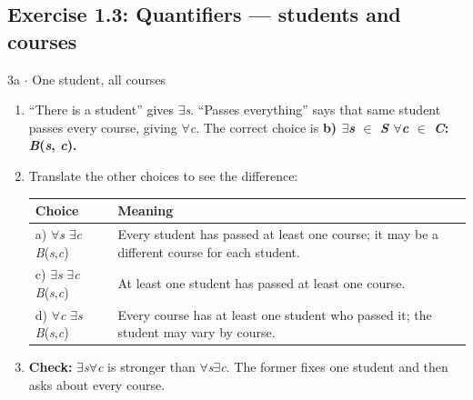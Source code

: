 \documentclass[11pt]{article}
\begin{document}
\begin{keepsection}\subsection{Exercise 1.3: Quantifiers — students and courses}

\begin{workedbox}{3a \ensuremath{\cdot} One student, all courses}
\begin{enumerate}
\item “There is a student” gives \ensuremath{\exists}\textit{s}. “Passes everything” says that same student passes every course, giving \ensuremath{\forall}\textit{c}. The correct choice is \textbf{b) \ensuremath{\exists}\textit{s} \ensuremath{\in} \textit{S} \ensuremath{\forall}\textit{c} \ensuremath{\in} \textit{C}: \textit{B}(\textit{s}, \textit{c}).}
\item {}
Translate the other choices to see the difference:

\begin{center}\small\begin{tabularx}{\linewidth}{>{\raggedright\arraybackslash}X>{\raggedright\arraybackslash}X}\toprule
\textbf{Choice} & \textbf{Meaning} \\ \midrule
a) \ensuremath{\forall}\textit{s} \ensuremath{\exists}\textit{c} \textit{B}(\textit{s},\textit{c}) & Every student has passed at least one course; it may be a different course for each student. \\
c) \ensuremath{\exists}\textit{s} \ensuremath{\exists}\textit{c} \textit{B}(\textit{s},\textit{c}) & At least one student has passed at least one course. \\
d) \ensuremath{\forall}\textit{c} \ensuremath{\exists}\textit{s} \textit{B}(\textit{s},\textit{c}) & Every course has at least one student who passed it; the student may vary by course. \\
\bottomrule\end{tabularx}\end{center}
\item \textbf{Check:} \ensuremath{\exists}\textit{s}\ensuremath{\forall}\textit{c} is stronger than \ensuremath{\forall}\textit{s}\ensuremath{\exists}\textit{c}. The former fixes one student and then asks about every course.
\end{enumerate}
\end{workedbox}

\end{keepsection}
\end{document}
